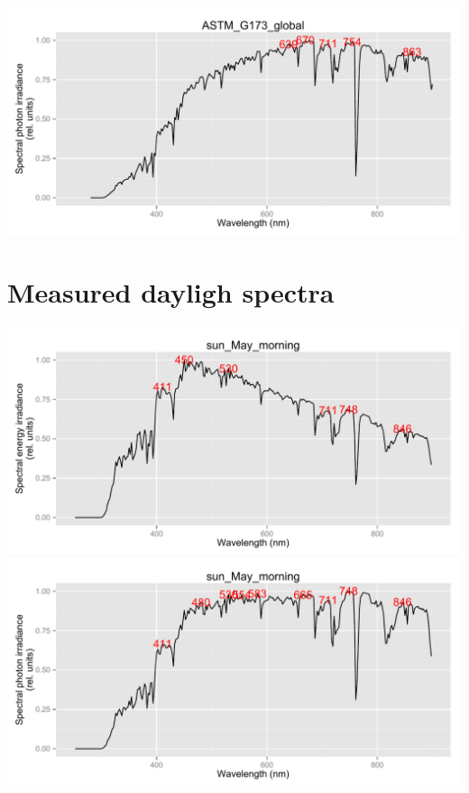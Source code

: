 \documentclass{article}\usepackage{knitr}
\begin{document}
\begin{knitrout}
{\includegraphics[width=.95\textwidth]{figure/pos-terrestrial-std4} 

}



\end{knitrout}

\section{Measured dayligh spectra}

\begin{knitrout}\footnotesize
{}\color{fgcolor}\begin{kframe}
\begin{alltt}
 \hlkwb{<-} \hlstd{(}\hlstd{)}
   
  \hlstd{(}
\hlstd{\}}
\end{alltt}
\end{kframe}

{\centering \includegraphics[width=.95\textwidth]{figure/pos-terrestrial-meas1} 
\includegraphics[width=.95\textwidth]{figure/pos-terrestrial-meas2} 

}



\end{knitrout}
\end{document}
